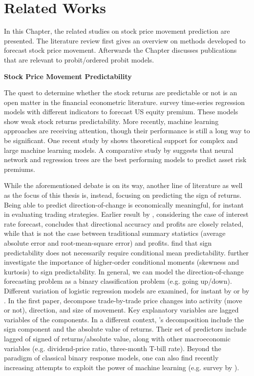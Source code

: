 \chapter{Related Works}\label{chap:relatedwork}

In this Chapter, the related studies on stock price movement prediction are presented. The literature review first gives an overview on methods developed to forecast stock price movement. Afterwards the Chapter discusses publications that are relevant to probit/ordered probit models.
\vspace{5mm}

{\noindent\bfseries Stock Price Movement Predictability}

The quest to determine whether the stock returns are predictable or not is an open matter in the financial econometric literature. \citet{rapach_forecasting_2013} survey time-series regression models with different indicators to forecast US equity premium. These models show weak stock returns predictability. More recently, machine learning approaches are receiving attention, though their performance is still a long way to be significant. One recent study by \citet{kelly_virtue_2024} shows theoretical support for complex and large machine learning models. A comparative study by \citet{gu_empirical_2020} suggests that neural network and regression trees are the best performing models to predict asset risk premiums. 

While the aforementioned debate is on its way, another line of literature as well as the focus of this thesis is, instead, focusing on predicting the sign of returns. Being able to predict direction-of-change is economically meaningful, for instant in evaluating trading strategies. Earlier result by \citet{leichttanner1991}, considering the case of interest rate forecast, concludes that directional accuracy and profits are closely related, while that is not the case between traditional summary statistics (average absolute error and root-mean-square error) and profits. \citet{christoffersen_financial_2006} find that sign predictability does not necessarily require conditional mean predictability. \citet{christoffersenetal2007} further investigate the importance of higher-order conditional moments (skewness and kurtosis) to sign predictability. In general, we can model the direction-of-change forecasting problem as a binary classification problem (e.g. going up/down). Different variation of logistic regression models are examined, for instant by \citet{rydbergshephard2003} or by \citet{anatolyevgospodinov2010}. In the first paper, \citet{rydbergshephard2003} decompose trade-by-trade price changes into activity (move or not), direction, and size of movement. Key explanatory variables are lagged variables of the components. In a different context, \citet{anatolyevgospodinov2010}’s decomposition include the sign component and the absolute value of returns. Their set of predictors include lagged of signed of returns/absolute value, along with other macroeconomic variables (e.g. dividend-price ratio, three-month T-bill rate). Beyond the paradigm of classical binary response models, one can also find recently increasing attempts to exploit the power of machine learning (e.g. survey by \citet{bustos_stock_2020}).  


